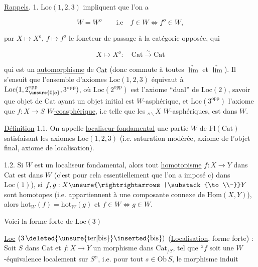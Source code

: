 \uline{Rappels}. 1. $\mathrm{Loc}(1,2,3)$ impliquent que l'on a

\[
W=W^o\qquad\text{i.e}\quad f\in W\iff f^o\in W,
\]

 par $X\longmapsto X^o$, $f\longmapsto f^o$ le
foncteur de passage à la catégorie opposée,  qui

\[
X\longmapsto X^o:\quad \mathrm{Cat}\xrightarrow{\sim}\mathrm{Cat}
\]

qui est un \uline{automorphisme} de $\mathrm{Cat}$ (donc
commute à toutes $\underrightarrow{\lim}$ et $\underrightarrow{\lim}$). Il
s'ensuit que l'ensemble d'axiomes
$\mathrm{Loc}(1,2,3)$ équivaut à $\mathrm{Loc}(1,2_{\unsure{0|o}}^{\mathrm{opp}},3^{\mathrm{opp}})$, où
$\mathrm{Loc}(2^{\mathrm{opp}})$ est l'axiome ``dual'' de $\mathrm{Loc}(2)$,
savoir que  objet de $\mathrm{Cat}$ ayant
un objet initial est $W$-asphérique, et
$\mathrm{Loc}(3^{\mathrm{opp}})$ l'axiome que  $f:X\to S$ \uline{$W$-coasphérique}, i.e telle que les 
$ {}_{s\backslash}X$    $W$-asphériques, est dans $W$.

 
\uline{Définition} 1.1. On appelle \uline{localiseur fondamental}
une partie $W$ de $\mathrm{Fl}(\mathrm{Cat})$ satisfaisant les
axiomes $\mathrm{Loc}(1,2,3)$ (i.e. saturation modérée,
axiome de l'objet final, axiome de localisation).

 1.2.  Si $W$ est un
localiseur fondamental, alors tout \uline{homotopisme}
$f:X\to Y$ dans $\mathrm{Cat}$ est dans $W$ (c'est pour cela
essentiellement que l'on a imposé c) dans  $\mathrm{Loc}(1)$),
si $f,g:X\unsure{\rightrightarrows|\substack{\to\\-}}Y$ sont homotopes (i.e. appartiennent
à une \unsure{$=$} composante connexe de $\underline{\mathrm{Hom}}(X,Y)$),
alors $\mathrm{hot}_W(f)=\mathrm{hot}_W(g)$ et $f\in W\iff g\in W$.

 Voici la forme forte de $\mathrm{Loc}(3)$


\uline{Loc} $(3\,\deleted{\unsure{\mathrm{ter}|\mathrm{bis}}}\inserted{\mathrm{bis}})$ (\uline{Localisation}, forme forte) : Soit $S$ dans $\mathrm{Cat}$
et $f:X\to Y$ un morphisme dans $\mathrm{Cat}_{/S}$, tel que
``$f$ soit une $W$-équivalence localement sur $S$'', i.e.
pour tout $s\in\mathrm{Ob}\,S$, le morphisme induit

